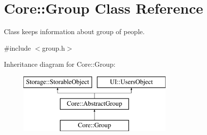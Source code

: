 \hypertarget{classCore_1_1Group}{
\section{Core::Group Class Reference}
\label{d2/d30/classCore_1_1Group}
}


Class keeps information about group of people.  




{\ttfamily \#include $<$group.h$>$}

Inheritance diagram for Core::Group:\begin{figure}[H]
\begin{center}
\leavevmode
\includegraphics[height=3.000000cm]{d2/d30/classCore_1_1Group}
\end{center}
\end{figure}
